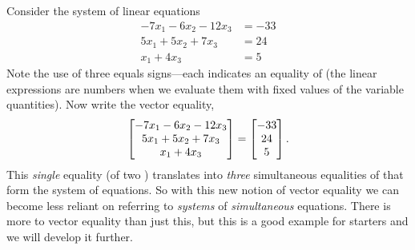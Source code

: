 \documentclass{ximera}
\begin{document}
\begin{example}
  Consider the system of linear equations
  \begin{align*}
    -7x_1 -6 x_2 - 12x_3 &=-33\\
    5x_1  + 5x_2 + 7x_3 &=24\\
    x_1 +4x_3 &=5
  \end{align*}
  Note the use of three equals signs---each indicates an equality of
   (the linear
  expressions are numbers when we evaluate them with fixed values of
  the variable quantities).  Now write the vector equality,
  \[
    \begin{bmatrix}-7x_1 -6 x_2 - 12x_3\\ 5x_1  + 5x_2 + 7x_3\\ x_1 +4x_3\end{bmatrix}
    =
    \begin{bmatrix}-33\\24\\5\end{bmatrix}.
  \]
  This \textit{single} equality (of two
  )
  translates into \textit{three} simultaneous equalities of
   that form the
  system of equations.  So with this new notion of vector equality we
  can become less reliant on referring to \textit{systems} of
  \textit{simultaneous} equations.  There is more to vector equality
  than just this, but this is a good example for starters and we will
  develop it further.
\end{example}
\end{document}

